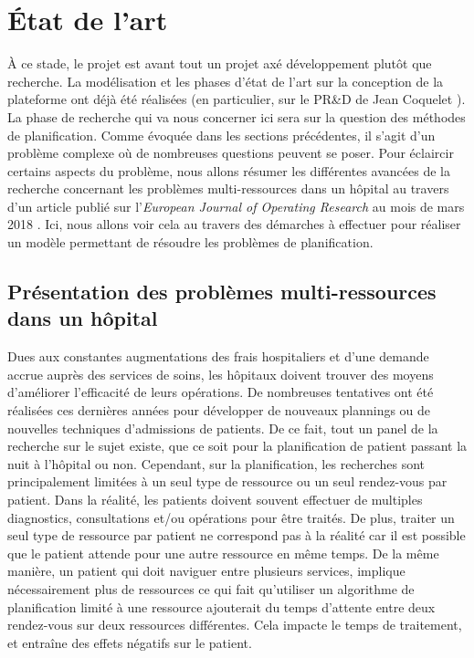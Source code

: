 \documentclass{polytech/polytech}
\begin{document}
\chapter{État de l'art}

À ce stade, le projet est avant tout un projet axé développement plutôt que recherche. La modélisation et les phases d'état de l'art sur la conception de la plateforme ont déjà été réalisées (en particulier, sur le PR\&D de Jean Coquelet \cite{coquelet_gestion_nodate}). La phase de recherche qui va nous concerner ici sera sur la question des méthodes de planification. Comme évoquée dans les sections précédentes, il s'agit d'un problème complexe où de nombreuses questions peuvent se poser. Pour éclaircir certains aspects du problème, nous allons résumer les différentes avancées de la recherche concernant les problèmes multi-ressources dans un hôpital au travers d'un article publié sur l'\textit{European Journal of Operating Research} au mois de mars 2018 \cite{marynissen_literature_2019}. Ici, nous allons voir cela au travers des démarches à effectuer pour réaliser un modèle permettant de résoudre les problèmes de planification.


\section{Présentation des problèmes multi-ressources dans un hôpital}

Dues aux constantes augmentations des frais hospitaliers et d'une demande accrue auprès des services de soins, les hôpitaux doivent trouver des moyens d'améliorer l'efficacité de leurs opérations. De nombreuses tentatives ont été réalisées ces dernières années pour développer de nouveaux plannings ou de nouvelles techniques d'admissions de patients. De ce fait, tout un panel de la recherche sur le sujet existe, que ce soit pour la planification de patient passant la nuit à l'hôpital ou non. Cependant, sur la planification, les recherches sont principalement limitées à un seul type de ressource ou un seul rendez-vous par patient. Dans la réalité, les patients doivent souvent effectuer de multiples diagnostics, consultations et/ou opérations pour être traités. De plus, traiter un seul type de ressource par patient ne correspond pas à la réalité car il est possible que le patient attende pour une autre ressource en même temps. De la même manière, un patient qui doit naviguer entre plusieurs services, implique nécessairement plus de ressources ce qui fait qu'utiliser un algorithme de planification limité à une ressource ajouterait du temps d'attente entre deux rendez-vous sur deux ressources différentes. Cela impacte le temps de traitement, et entraîne des effets négatifs sur le patient.
\end{document}
